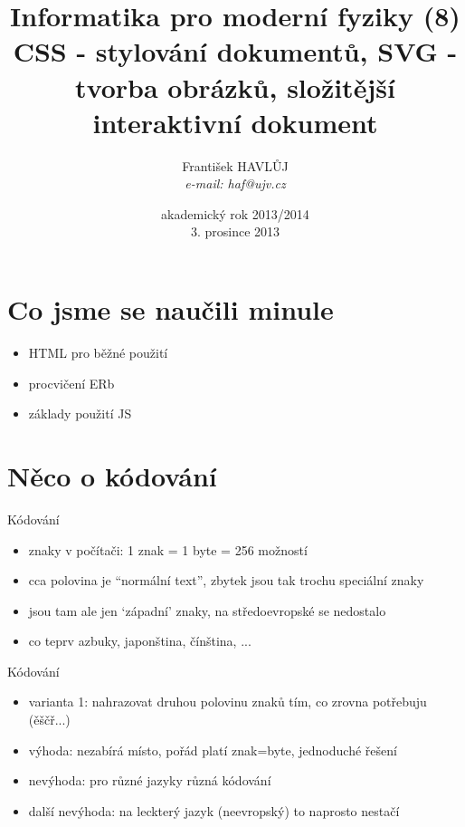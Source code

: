 \documentclass{beamer}
\title[IMF (8)]{Informatika pro moderní fyziky (8)\\ CSS - stylování dokumentů, SVG - tvorba obrázků, složitější interaktivní dokument}
\author[Franti\v{s}ek HAVL\r{U}J, ORF ÚJV Řež]{Franti\v{s}ek HAVL\r{U}J\\{\scriptsize \emph{e-mail: haf@ujv.cz}}}
\date{akademický rok 2013/2014\\3. prosince 2013}
\institute[ORF ÚJV Řež]
{ÚJV Řež\\oddělení Reaktorové fyziky a podpory palivového cyklu}
\begin{document}
\begin{frame}
  \titlepage
\end{frame}

\begin{frame}
  \tableofcontents
\end{frame}

\section{Co jsme se naučili minule}

\begin{frame}{}
  \begin{itemize}
    \item HTML pro běžné použití
    \item procvičení ERb
    \item základy použití JS
  \end{itemize}
\end{frame}

\section{Něco o kódování}

\begin{frame}{Kódování}
  \begin{itemize}
    \item znaky v počítači: 1 znak = 1 byte = 256 možností
    \item cca polovina je ``normální text'', zbytek jsou tak trochu speciální znaky
    \item jsou tam ale jen `západní' znaky, na středoevropské se nedostalo
    \item co teprv azbuky, japonština, čínština, ...
  \end{itemize}
\end{frame}

\begin{frame}{Kódování}
  \begin{itemize}
    \item varianta 1: nahrazovat druhou polovinu znaků tím, co zrovna potřebuju (ěščř...)
    \item výhoda: nezabírá místo, pořád platí znak=byte, jednoduché řešení
    \item nevýhoda: pro různé jazyky různá kódování
    \item další nevýhoda: na leckterý jazyk (neevropský) to naprosto nestačí
  \end{itemize}
\end{frame}
\end{document}
